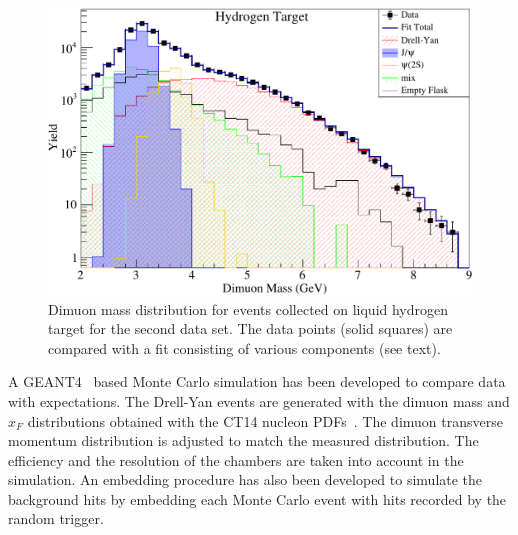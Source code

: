 \documentclass[reprint,aps,unsortedaddress,superscriptaddress,prl,floatfix,showpacs,linenumbers]{revtex4-2}
\begin{document}
\begin{figure}[htbp!]
	\centering
	\includegraphics[width=\linewidth]{massfit_run56_LH2.pdf}
	\caption{Dimuon mass distribution for events collected
		on liquid hydrogen target for the second data set.
		The data points (solid squares) are compared with a fit consisting of
		various components (see text).}
	\label{fig:massfit}
\end{figure}

A GEANT4~\cite{agostinelli2003,allison2006,allison2016} based Monte
Carlo simulation has been developed to compare data with expectations.
The Drell-Yan events are generated with the dimuon mass and $x_F$
distributions obtained with the CT14 nucleon PDFs~\cite{hou2018}.
The dimuon transverse momentum distribution is adjusted to match the measured distribution.
The efficiency and the resolution of the chambers are taken into account in the simulation.
An embedding procedure has also been developed to simulate the background hits by embedding each Monte Carlo event
with hits recorded by the random trigger.
\end{document}
